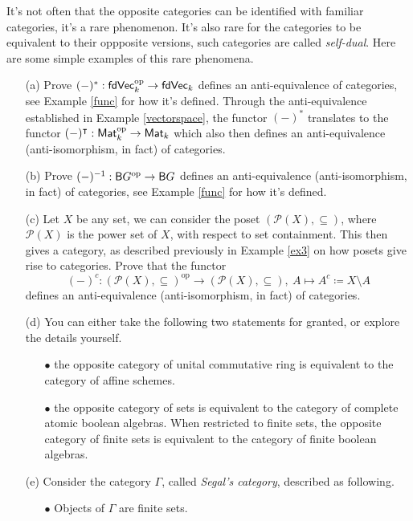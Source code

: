 \begin{problem}\label{prob 3.6}
It's not often that the opposite categories can be identified with familiar categories, it's a rare phenomenon. It's also rare for the categories to be equivalent to their oppposite versions, such categories are called \emph{self-dual}. Here are some simple examples of this rare phenomena.
\begin{itemize}
\item[(a)] Prove $(-)^*:\mathsf{fdVec}^{\text{op}}_k \to \mathsf{fdVec}_k$ defines an anti-equivalence of categories, see Example \ref{func} for how it's defined. Through the anti-equivalence established in Example \ref{vectorspace}, the functor $(-)^*$ translates to the functor $(-)^{\intercal}:\mathsf{Mat}_k^{\text{op}} \to \mathsf{Mat}_k$ which also then defines an anti-equivalence (anti-isomorphism, in fact) of categories.
\item[(b)] Prove $(-)^{-1}:\mathsf{B}G^{\text{op}} \to \mathsf{B}G$ defines an anti-equivalence (anti-isomorphism, in fact) of categories, see Example \ref{func} for how it's defined. 
\item[(c)] Let $X$ be any set, we can consider the poset $(\mathscr{P}(X),\subseteq)$, where $\mathscr{P}(X)$ is the power set of $X$, with respect to set containment. This then gives a category, as described previously in Example \ref{ex3} on how posets give rise to categories. Prove that the functor
\[(-)^c:(\mathscr{P}(X),\subseteq)^{\text{op}} \to (\mathscr{P}(X),\subseteq),\ A \mapsto A^c \coloneqq X \setminus A\]
defines an anti-equivalence (anti-isomorphism, in fact) of categories.
\item[(d)] You can either take the following two statements for granted, or explore the details yourself. 
\begin{itemize}
\item[$\bullet$] the opposite category of unital commutative ring is equivalent to the category of affine schemes.
\item[$\bullet$] the opposite category of sets is equivalent to the category of complete atomic boolean algebras. When restricted to finite sets, the opposite category of finite sets is equivalent to the category of finite boolean algebras.
\end{itemize}
\item[(e)] Consider the category $\Gamma$, called \emph{Segal's category}, described as following.
\begin{itemize}
\item[$\bullet$] Objects of $\Gamma$ are finite sets.

\end{itemize}
\end{itemize}
\end{problem}
